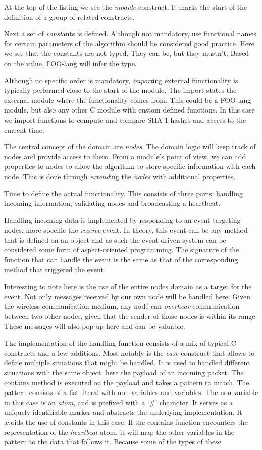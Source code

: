 \documentclass[conference]{IEEEtran}
\begin{document}
At the top of the listing we see the \emph{module} construct. It marks the
start of the definition of a group of related constructs.

Next a set of \emph{const}ants is defined. Although not mandatory, use
functional names for certain parameters of the algorithm should be considered
good practice. Here we see that the constants are not typed. They can be, but
they mustn't. Based on the value, FOO-lang will infer the type.

Although no specific order is mandatory, \emph{import}ing external
functionality is typically performed close to the start of the module. The
import states the external module where the functionality comes from. This
could be a FOO-lang module, but also any other C module with custom defined
functions. In this case we import functions to compute and compare SHA-1 hashes
and access to the current time.

The central concept of the domain are \emph{nodes}. The domain logic will keep
track of nodes and provide access to them. From a module's point of view, we
can add properties to nodes to allow the algorithm to store specific
information with each node. This is done through \emph{extend}ing the
\emph{nodes} with additional properties.

Time to define the actual functionality. This consists of three parts: handling
incoming information, validating nodes and broadcasting a heartbeat.

Handling incoming data is implemented by responding to an event targeting
nodes, more specific the \emph{receive} event. In theory, this event can be any
method that is defined on an object and as such the event-driven system can be
considered some form of aspect-oriented programming. The signature of the
function that can handle the event is the same as that of the corresponding
method that triggered the event.

Interesting to note here is the use of the entire nodes domain as a target for
the event. Not only messages received by our own node will be handled here.
Given the wireless communication medium, any node can \emph{overhear}
communication between two other nodes, given that the sender of those nodes is
within its range. These messages will also pop up here and can be valuable.

The implementation of the handling function consists of a mix of typical C
constructs and a few additions. Most notably is the \emph{case} construct that
allows to define multiple situations that might be handled. It is used to
handled different situations with the same object, here the payload of an
incoming packet. The contains method is executed on the payload and takes a
pattern to match. The pattern consists of a list literal with non-variables and
variables. The non-variable in this case is an \emph{atom}, and is prefixed
with a `\#' character. It serves as a uniquely identifiable marker and abstracts
the underlying implementation. It avoids the use of constants in this case. If
the contains function encounters the representation of the \emph{heartbeat}
atom, it will map the other variables in the pattern to the data that follows
it. Because some of the types of these
\end{document}
